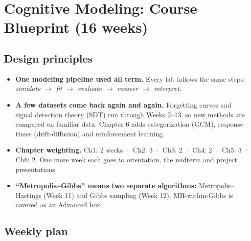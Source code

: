
\section{Cognitive Modeling: Course Blueprint (16 weeks)}

\subsection{Design principles}

\begin{itemize}
\tightlist
\item
  \textbf{One modeling pipeline used all term.} Every lab follows the
  same steps: \emph{simulate \ensuremath{\rightarrow} fit \ensuremath{\rightarrow} evaluate \ensuremath{\rightarrow} recover \ensuremath{\rightarrow} interpret}.
\item
  \textbf{A few datasets come back again and again.} Forgetting curves
  and signal detection theory (SDT) run through Weeks 2--13, so new
  methods are compared on familiar data. Chapter 6 adds categorization
  (GCM), response times (drift-diffusion) and reinforcement learning.
\item
  \textbf{Chapter weighting.} Ch1: 2 weeks · Ch2: 3 · Ch3: 2 · Ch4: 2 ·
  Ch5: 3 · Ch6: 2. One more week each goes to orientation, the midterm
  and project presentations.
\item
  \textbf{``Metropolis--Gibbs'' means two separate algorithms:}
  Metropolis--Hastings (Week 11) and Gibbs sampling (Week 12).
  MH-within-Gibbs is covered as an Advanced box.
\end{itemize}

\subsection{Weekly plan}


